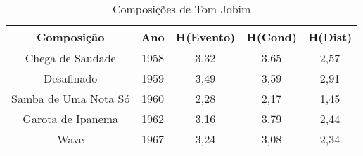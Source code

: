 \begin{table}[]
\centering
\caption{Composições de Tom Jobim}
\begin{tabular}{|c|c|c|c|c|}
\hline
\rowcolor[HTML]{9B9B9B} 
{\color[HTML]{FFFFFF} Composição} & {\color[HTML]{FFFFFF} Ano} & {\color[HTML]{FFFFFF} H(Evento)} & {\color[HTML]{FFFFFF} H(Cond)} & {\color[HTML]{FFFFFF} H(Dist)} \\ \hline
Chega de Saudade                  & 1958                       & 3,32                             & 3,65                           & 2,57                           \\ \hline
Desafinado                        & 1959                       & 3,49                             & 3,59                           & 2,91                           \\ \hline
Samba de Uma Nota Só              & 1960                       & 2,28                             & 2,17                           & 1,45                           \\ \hline
Garota de Ipanema                 & 1962                       & 3,16                             & 3,79                           & 2,44                           \\ \hline
Wave                              & 1967                       & 3,24                             & 3,08                           & 2,34                           \\ \hline
\end{tabular}
\end{table}

